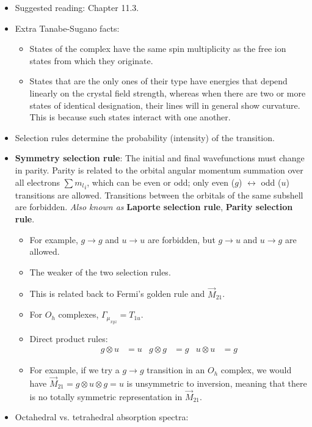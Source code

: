 \documentclass[../notes.tex]{subfiles}
\begin{document}
\begin{itemize}
    \item {}Suggested reading: Chapter 11.3.
    \item Extra Tanabe-Sugano facts:
    \begin{itemize}
        \item States of the complex have the same spin multiplicity as the free ion states from which they originate.
        \item States that are the only ones of their type have energies that depend linearly on the crystal field strength, whereas when there are two or more states of identical designation, their lines will in general show curvature. This is because such states interact with one another.
    \end{itemize}
    \item Selection rules determine the probability (intensity) of the transition.
    \item \textbf{Symmetry selection rule}: The initial and final wavefunctions must change in parity. Parity is related to the orbital angular momentum summation over all electrons $\sum {m_l}_i$, which can be even or odd; only even ($g$) $\leftrightarrow$ odd ($u$) transitions are allowed. Transitions between the orbitals of the same subshell are forbidden. \emph{Also known as} \textbf{Laporte selection rule}, \textbf{Parity selection rule}.
    \begin{itemize}
        \item For example, $g\to g$ and $u\to u$ are forbidden, but $g\to u$ and $u\to g$ are allowed.
        \item The weaker of the two selection rules.
        \item This is related back to Fermi's golden rule and $\vec{M}_{21}$.
        \item For $O_h$ complexes, $\Gamma_{\mu_{xyz}}=T_{1u}$.
        \item Direct product rules:
        \begin{align*}
            g\otimes u &= u&
            g\otimes g &= g&
            u\otimes u &= g
        \end{align*}
        \item For example, if we try a $g\to g$ transition in an $O_h$ complex, we would have $\vec{M}_{21}=g\otimes u\otimes g=u$ is unsymmetric to inversion, meaning that there is no totally symmetric representation in $\vec{M}_{21}$.
    \end{itemize}
    \item Octahedral vs. tetrahedral absorption spectra:

\end{itemize}
\end{document}
